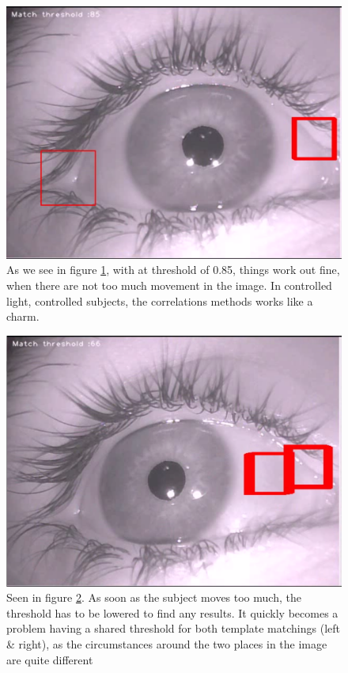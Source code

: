 \begin{figure}[htbp]
\centering
\includegraphics{pics/template_matching/1.png}
\caption{As we see in figure \ref{tm1}, with at threshold of 0.85,
things work out fine, when there are not too much movement in the image.
In controlled light, controlled subjects, the correlations methods works
like a charm. \label{tm1}}
\end{figure}

\begin{figure}[htbp]
\centering
\includegraphics{pics/template_matching/2.png}
\caption{Seen in figure \ref{tm2}. As soon as the subject moves too
much, the threshold has to be lowered to find any results. It quickly
becomes a problem having a shared threshold for both template matchings
(left \& right), as the circumstances around the two places in the image
are quite different \label{tm2}}
\end{figure}

